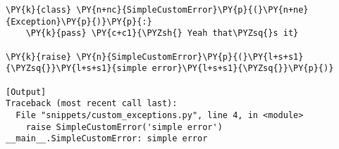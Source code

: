 \begin{Verbatim}[label=\makebox{\url{https://github.com/lucabaldini/cmepda/tree/master/slides/latex/snippets/custom\_exceptions.py}},commandchars=\\\{\}]
\PY{k}{class} \PY{n+nc}{SimpleCustomError}\PY{p}{(}\PY{n+ne}{Exception}\PY{p}{)}\PY{p}{:}  
    \PY{k}{pass} \PY{c+c1}{\PYZsh{} Yeah that\PYZsq{}s it}

\PY{k}{raise} \PY{n}{SimpleCustomError}\PY{p}{(}\PY{l+s+s1}{\PYZsq{}}\PY{l+s+s1}{simple error}\PY{l+s+s1}{\PYZsq{}}\PY{p}{)}

[Output]
Traceback (most recent call last):
  File "snippets/custom_exceptions.py", line 4, in <module>
    raise SimpleCustomError('simple error')
__main__.SimpleCustomError: simple error
\end{Verbatim}